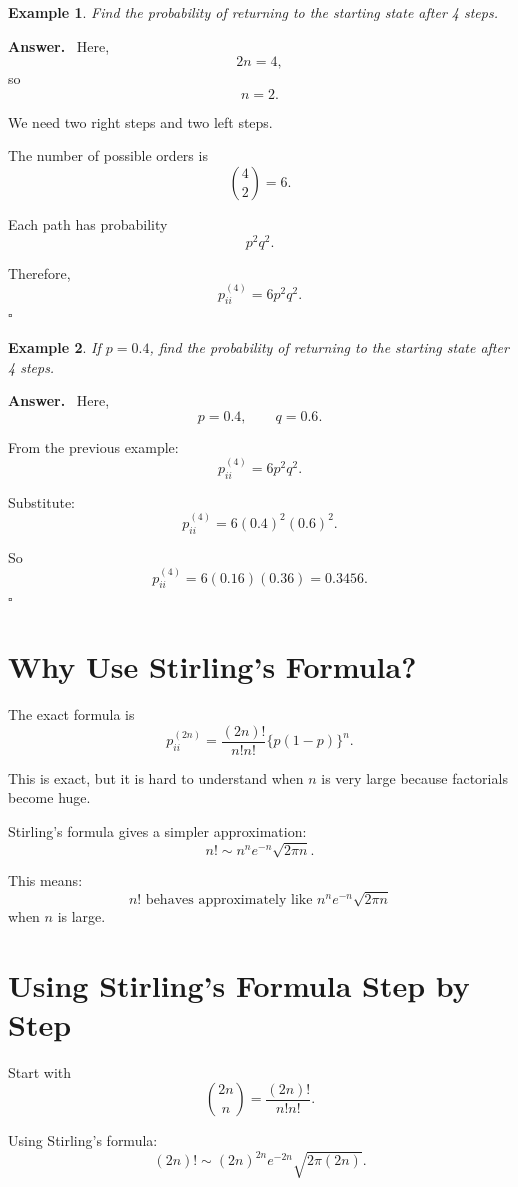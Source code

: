 \documentclass[12pt,a4paper]{article}
\theoremstyle{notestyle}
\newtheorem{example}{Example}
\newenvironment{answer}
{\par\textbf{Answer.}\ }
{\hfill$\square$\par}
\begin{document}
\begin{example}
Find the probability of returning to the starting state after 4 steps.
\end{example}

\begin{answer}
Here,
\[
2n=4,
\]
so
\[
n=2.
\]

We need two right steps and two left steps.

The number of possible orders is
\[
\binom{4}{2}=6.
\]

Each path has probability
\[
p^2q^2.
\]

Therefore,
\[
p_{ii}^{(4)}=6p^2q^2.
\]
\end{answer}

\begin{example}
If $p=0.4$, find the probability of returning to the starting state after 4 steps.
\end{example}

\begin{answer}
Here,
\[
p=0.4,\qquad q=0.6.
\]

From the previous example:
\[
p_{ii}^{(4)}=6p^2q^2.
\]

Substitute:
\[
p_{ii}^{(4)}
=
6(0.4)^2(0.6)^2.
\]

So
\[
p_{ii}^{(4)}
=
6(0.16)(0.36)
=
0.3456.
\]
\end{answer}

\section{Why Use Stirling's Formula?}

The exact formula is
\[
p_{ii}^{(2n)}
=
\frac{(2n)!}{n!n!}\{p(1-p)\}^n.
\]

This is exact, but it is hard to understand when $n$ is very large because factorials become huge.

Stirling's formula gives a simpler approximation:
\[
n!\sim n^ne^{-n}\sqrt{2\pi n}.
\]

This means:
\[
n!\text{ behaves approximately like }n^ne^{-n}\sqrt{2\pi n}
\]
when $n$ is large.

\section{Using Stirling's Formula Step by Step}

Start with
\[
\binom{2n}{n}
=
\frac{(2n)!}{n!n!}.
\]

Using Stirling's formula:
\[
(2n)!\sim (2n)^{2n}e^{-2n}\sqrt{2\pi(2n)}.
\]
\end{document}
